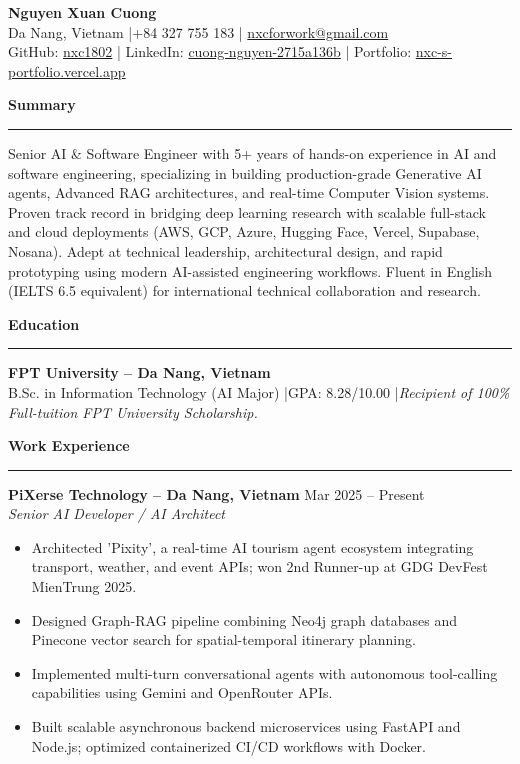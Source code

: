 \documentclass[10pt,a4paper]{article}
\newcommand{\sectionhr}[1]{%
  \vspace{0.4em}\noindent\textbf{\large #1}\par
  \vspace{0.2em}\hrule\vspace{0.4em}
}
\begin{document}
\begin{center}
    {\LARGE \textbf{Nguyen Xuan Cuong}}\\[2pt]
    Da Nang, Vietnam \quad|\quad +84 327 755 183 \quad|\quad
    \href{mailto:nxcforwork@gmail.com}{nxcforwork@gmail.com} \\
    GitHub: \href{https://github.com/nxc1802}{nxc1802} \quad|\quad
    LinkedIn: \href{https://www.linkedin.com/in/cuong-nguyen-2715a136b}{cuong-nguyen-2715a136b} \quad|\quad
    Portfolio: \href{https://nxc-s-portfolio.vercel.app/}{nxc-s-portfolio.vercel.app}
\end{center}

\sectionhr{Summary}
Senior AI \& Software Engineer with 5+ years of hands-on experience in AI and software engineering, specializing in building production-grade Generative AI agents, Advanced RAG architectures, and real-time Computer Vision systems. Proven track record in bridging deep learning research with scalable full-stack and cloud deployments (AWS, GCP, Azure, Hugging Face, Vercel, Supabase, Nosana). Adept at technical leadership, architectural design, and rapid prototyping using modern AI-assisted engineering workflows. Fluent in English (IELTS 6.5 equivalent) for international technical collaboration and research.

\sectionhr{Education}
\textbf{FPT University – Da Nang, Vietnam} \\
B.Sc. in Information Technology (AI Major) \quad|\quad GPA: 8.28/10.00 \quad|\quad \emph{Recipient of 100\% Full-tuition FPT University Scholarship.}

\sectionhr{Work Experience}

\textbf{PiXerse Technology – Da Nang, Vietnam} \hfill Mar 2025 -- Present \\
\emph{Senior AI Developer / AI Architect}
\begin{itemize}
\item Architected 'Pixity', a real-time AI tourism agent ecosystem integrating transport, weather, and event APIs; won 2nd Runner-up at GDG DevFest MienTrung 2025.
\item Designed Graph-RAG pipeline combining Neo4j graph databases and Pinecone vector search for spatial-temporal itinerary planning.
\item Implemented multi-turn conversational agents with autonomous tool-calling capabilities using Gemini and OpenRouter APIs.
\item Built scalable asynchronous backend microservices using FastAPI and Node.js; optimized containerized CI/CD workflows with Docker.
\end{itemize}
\end{document}
